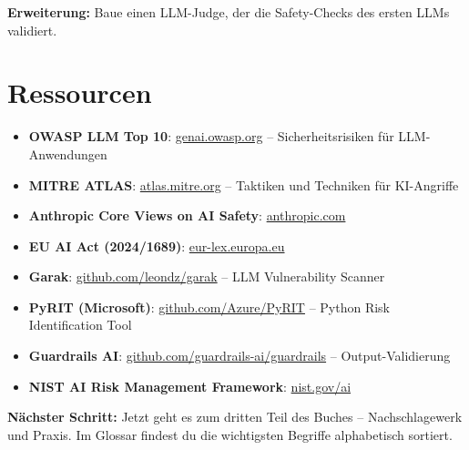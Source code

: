 \textbf{Erweiterung:} Baue einen LLM-Judge, der die Safety-Checks des ersten LLMs validiert.

\section{Ressourcen}

\begin{itemize}[leftmargin=*]
    \item \textbf{OWASP LLM Top 10}: \href{https://genai.owasp.org}{genai.owasp.org} -- Sicherheitsrisiken für LLM-Anwendungen
    \item \textbf{MITRE ATLAS}: \href{https://atlas.mitre.org}{atlas.mitre.org} -- Taktiken und Techniken für KI-Angriffe
    \item \textbf{Anthropic Core Views on AI Safety}: \href{https://anthropic.com/news/core-views-on-ai-safety}{anthropic.com}
    \item \textbf{EU AI Act (2024/1689)}: \href{https://eur-lex.europa.eu/eli/reg/2024/1689}{eur-lex.europa.eu}
    \item \textbf{Garak}: \href{https://github.com/leondz/garak}{github.com/leondz/garak} -- LLM Vulnerability Scanner
    \item \textbf{PyRIT (Microsoft)}: \href{https://github.com/Azure/PyRIT}{github.com/Azure/PyRIT} -- Python Risk Identification Tool
    \item \textbf{Guardrails AI}: \href{https://github.com/guardrails-ai/guardrails}{github.com/guardrails-ai/guardrails} -- Output-Validierung
    \item \textbf{NIST AI Risk Management Framework}: \href{https://www.nist.gov/ai}{nist.gov/ai}
\end{itemize}

\textbf{Nächster Schritt:} Jetzt geht es zum dritten Teil des Buches -- Nachschlagewerk und Praxis. Im Glossar findest du die wichtigsten Begriffe alphabetisch sortiert.
